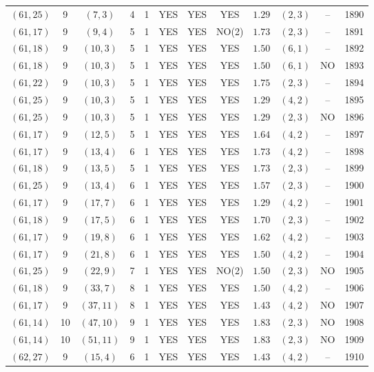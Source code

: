 \begin{longtable}{|c|c|c|c|c|c|c|c|c|c|c|c|}
$(61,25)$ & 9 & $(7,3)$ & 4 & 1 & YES & YES & YES & $1.29$ & $(2,3)$ & -- & 1890\\
$(61,17)$ & 9 & $(9,4)$ & 5 & 1 & YES & YES & NO(2) & $1.73$ & $(2,3)$ & -- & 1891\\
$(61,18)$ & 9 & $(10,3)$ & 5 & 1 & YES & YES & YES & $1.50$ & $(6,1)$ & -- & 1892\\
$(61,18)$ & 9 & $(10,3)$ & 5 & 1 & YES & YES & YES & $1.50$ & $(6,1)$ & NO & 1893\\
$(61,22)$ & 9 & $(10,3)$ & 5 & 1 & YES & YES & YES & $1.75$ & $(2,3)$ & -- & 1894\\
$(61,25)$ & 9 & $(10,3)$ & 5 & 1 & YES & YES & YES & $1.29$ & $(4,2)$ & -- & 1895\\
$(61,25)$ & 9 & $(10,3)$ & 5 & 1 & YES & YES & YES & $1.29$ & $(2,3)$ & NO & 1896\\
$(61,17)$ & 9 & $(12,5)$ & 5 & 1 & YES & YES & YES & $1.64$ & $(4,2)$ & -- & 1897\\
$(61,17)$ & 9 & $(13,4)$ & 6 & 1 & YES & YES & YES & $1.73$ & $(4,2)$ & -- & 1898\\
$(61,18)$ & 9 & $(13,5)$ & 5 & 1 & YES & YES & YES & $1.73$ & $(2,3)$ & -- & 1899\\
$(61,25)$ & 9 & $(13,4)$ & 6 & 1 & YES & YES & YES & $1.57$ & $(2,3)$ & -- & 1900\\
$(61,17)$ & 9 & $(17,7)$ & 6 & 1 & YES & YES & YES & $1.29$ & $(4,2)$ & -- & 1901\\
$(61,18)$ & 9 & $(17,5)$ & 6 & 1 & YES & YES & YES & $1.70$ & $(2,3)$ & -- & 1902\\
$(61,17)$ & 9 & $(19,8)$ & 6 & 1 & YES & YES & YES & $1.62$ & $(4,2)$ & -- & 1903\\
$(61,17)$ & 9 & $(21,8)$ & 6 & 1 & YES & YES & YES & $1.50$ & $(4,2)$ & -- & 1904\\
$(61,25)$ & 9 & $(22,9)$ & 7 & 1 & YES & YES & NO(2) & $1.50$ & $(2,3)$ & NO & 1905\\
$(61,18)$ & 9 & $(33,7)$ & 8 & 1 & YES & YES & YES & $1.50$ & $(4,2)$ & -- & 1906\\
$(61,17)$ & 9 & $(37,11)$ & 8 & 1 & YES & YES & YES & $1.43$ & $(4,2)$ & NO & 1907\\
$(61,14)$ & 10 & $(47,10)$ & 9 & 1 & YES & YES & YES & $1.83$ & $(2,3)$ & NO & 1908\\
$(61,14)$ & 10 & $(51,11)$ & 9 & 1 & YES & YES & YES & $1.83$ & $(2,3)$ & NO & 1909\\
$(62,27)$ & 9 & $(15,4)$ & 6 & 1 & YES & YES & YES & $1.43$ & $(4,2)$ & -- & 1910\\

\end{longtable}
